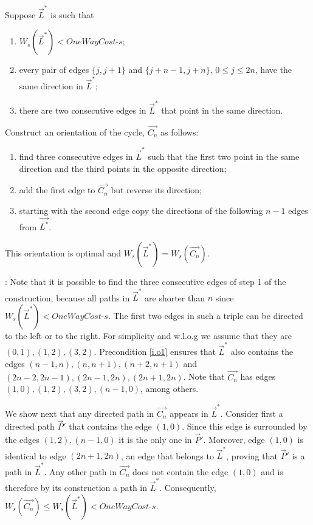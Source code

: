 \begin{lemma}\label{l.last}
	Suppose $\vec{L}^*$ is such that 
	\begin{enumerate}
		\item $W_s(\vec{L}^*) < \textit{OneWayCost-s}$;
		\item \label{i.o1}every pair of edges $\{j,j+1\}$ and $\{j+n-1,j+n\}$, $0\leq j \leq 2n$,
		 have the same direction in $\vec{L}^*$;
		\item there are two consecutive edges in  $\vec{L}^*$ that point in the same direction.
	\end{enumerate} 
Construct an orientation of the cycle, $\vec{C_n}$ as follows:
\begin{enumerate}
	\item find three consecutive edges in $\vec{L}^*$ such that the first two point in the same direction and the third points in the opposite direction;
	\item add the first edge to $\vec{C_n}$ but reverse its direction;
	\item starting with the second edge copy the directions of the following $n-1$ edges 
	from $\vec{L^*}$.
\end{enumerate}
This orientation is optimal and $W_s(\vec{L}^*) = W_s(\vec{C_n})$.
	\end{lemma}
: 
Note that it is possible to find the three consecutive edges of step 1 of the construction, because 
all paths in $\vec{L}^*$ are shorter than $n$ since $W_s(\vec{L}^*) < \textit{OneWayCost-s}$.
The first two edges in such a triple can be directed to the left or to the right.
For simplicity and w.l.o.g we assume that they are $(0,1), (1,2),(3,2)$. Precondition
	 \ref{i.o1} ensures that $\vec{L}^*$ also contains the edges $(n-1,n),(n,n+1),(n+2,n+1)$ and $(2n-2,2n-1),(2n-1,2n), (2n+1,2n) $. Note that  $\vec{C_n}$ has edges 
	 $(1,0), (1,2),(3,2),(n-1,0)$, among others.
	
	We show next that any directed path in $\vec{C_n}$ appears in $\vec{L}^*$. Consider first a directed path $\vec{P}'$ that contains the edge $(1,0)$. 
	Since this edge is surrounded by the edges $(1,2), (n-1,0)$ it is the only one in $\vec{P}'$. Moreover, edge $(1,0)$ is identical to edge $(2n+1,2n)$, an edge that belongs to 
	$\vec{L}^*$, proving that  $\vec{P}'$ is a path in $\vec{L}^*$.
	Any other path in $\vec{C_n}$ does not contain the edge $(1,0)$ and is therefore by its construction a path in $\vec{L}^*$. 
	Consequently, $W_s(\vec{C_n})\leq W_s(\vec{L}^*)<\textit{OneWayCost-s}$.
	
